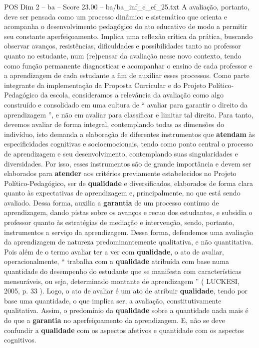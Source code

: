 \begin{textsample}{POS Dim 2 – ba – Score 23.00 – ba/ba\_inf\_e\_ef\_25.txt}
A avaliação, portanto, deve ser pensada como um processo dinâmico e sistemático que orienta e acompanha o desenvolvimento pedagógico do ato educativo de modo a permitir seu constante aperfeiçoamento.
Implica uma reflexão crítica da prática, buscando observar avanços, resistências, dificuldades e possibilidades tanto no professor quanto no estudante, num (re)pensar da avaliação nesse novo contexto, tendo como função permanente diagnosticar e acompanhar o ensino de cada professor e a aprendizagem de cada estudante a fim de auxiliar esses processos.
Como parte integrante da implementação da Proposta Curricular e do Projeto Político-Pedagógico da escola, consideramos a relevância da avaliação como algo construído e consolidado em uma cultura de “ avaliar para garantir o direito da aprendizagem ”, e não em avaliar para classificar e limitar tal direito.
Para tanto, devemos avaliar de forma integral, contemplando todas as dimensões do indivíduo, isto demanda a elaboração de diferentes instrumentos que \textbf{atendam} às especificidades cognitivas e socioemocionais, tendo como ponto central o processo de aprendizagem e seu desenvolvimento, contemplando suas singularidades e diversidades.
Por isso, esses instrumentos são de grande importância e devem ser elaborados para \textbf{atender} aos critérios previamente estabelecidos no Projeto Político-Pedagógico, ser de \textbf{qualidade} e diversificados, elaborados de forma clara quanto às expectativas de aprendizagem e, principalmente, no que está sendo avaliado.
Dessa forma, auxilia a \textbf{garantia} de um processo contínuo de aprendizagem, dando pistas sobre os avanços e recuo dos estudantes, e subsidia o professor quanto às estratégias de mediação e intervenção, sendo, portanto, instrumentos a serviço da aprendizagem.
Dessa forma, defendemos uma avaliação da aprendizagem de natureza predominantemente qualitativa, e não quantitativa.
Pois além de o termo avaliar ter a ver com \textbf{qualidade}, o ato de avaliar, operacionalmente, “ trabalha com a \textbf{qualidade} atribuída com base numa quantidade do desempenho do estudante que se manifesta com características mensuráveis, ou seja, determinado montante de aprendizagem ” ( LUCKESI, 2005, p. 33 ).
Logo, o ato de avaliar é um ato de atribuir \textbf{qualidade}, tendo por base uma quantidade, o que implica ser, a avaliação, constitutivamente qualitativa.
Assim, o predomínio da \textbf{qualidade} sobre a quantidade nada mais é do que a \textbf{garantia} no aperfeiçoamento da aprendizagem.
E, não se deve confundir a \textbf{qualidade} com os aspectos afetivos e quantidade com os aspectos cognitivos.

\end{textsample}
